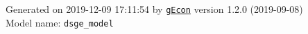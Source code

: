 \documentclass[10pt,a4paper]{article}
\numberwithin{equation}{section}
\begin{document}
\begin{flushleft}{\large
Generated  on 2019-12-09 17:11:54 by \href{http://gecon.r-forge.r-project.org/}{\texttt{gEcon}} version 1.2.0 (2019-09-08)\\
Model name: \verb+dsge_model+
}\end{flushleft}



\end{document}
